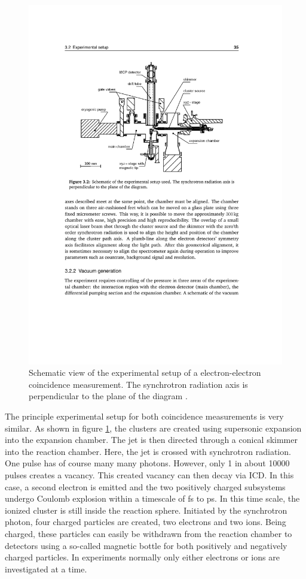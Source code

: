 \begin{figure}[h]
  \centering
  \includegraphics[]{pics/exp_setup_overview.pdf}
  \caption{Schematic view of the experimental setup of a electron-electron
           coincidence measurement. The synchrotron radiation axis
           is perpendicular to the plane of the diagram \cite{PhDFoerstel}.}
  \label{figure:exp_setup_overview}
\end{figure}

The principle experimental setup for both coincidence measurements is very similar.
As shown in figure \ref{figure:exp_setup_overview},
the clusters are created using supersonic expansion into
the expansion chamber. The jet is then directed through a conical skimmer
into the reaction chamber. Here, 
the jet is crossed with synchrotron radiation.
One pulse has of course many many photons. However, only 1 in about 10000
pulses creates a vacancy.
This created vacancy can then decay via ICD.
In this case, a second electron is emitted and the two positively charged
subsystems undergo
Coulomb explosion within a timescale of \unit{fs} to \unit[]{ps}.
In this time scale, the ionized cluster is still inside the reaction sphere.
Initiated by the synchrotron photon, four charged particles are created,
two electrons and two ions.
Being charged, these particles can easily be withdrawn from the reaction
chamber to detectors using a so-called magnetic bottle for both positively
and negatively charged particles. In experiments normally only either electrons
or ions are investigated at a time.

